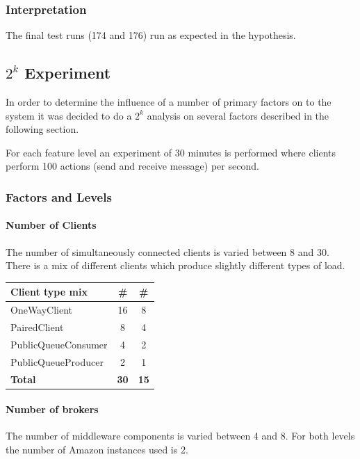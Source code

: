 \documentclass[milestone1.tex]{subfiles}
\begin{document}
\subsubsection{Interpretation}
The final test runs (174 and 176) run as expected in the hypothesis.

\subsection{$2^k$ Experiment}
In order to determine the influence of a number of primary factors on to the system it was decided to do a $2^k$ analysis on several factors described in the following section.

For each feature level an experiment of 30 minutes is performed where clients perform 100 actions (send and receive message) per second.

\subsubsection{Factors and Levels}

\paragraph{Number of Clients}
The number of simultaneously connected clients is varied between 8 and 30. There is a mix of different clients which produce slightly different types of load.

\begin{tabular}{|l|c|c|}
\hline 
\textbf{Client type mix } & \textbf{\#} & \textbf{\#} \\ 
\hline 
OneWayClient & 16 & 8  \\ 
\hline 
PairedClient & 8 & 4 \\ 
\hline 
PublicQueueConsumer & 4 & 2 \\ 
\hline 
PublicQueueProducer & 2 & 1 \\ 
\hline 
\textbf{Total}  & \textbf{30} & \textbf{15} \\
\hline 
\end{tabular} 

\paragraph{Number of brokers}

The number of middleware components is varied between 4 and 8. For both levels the number of Amazon instances used is 2.
\end{document}
